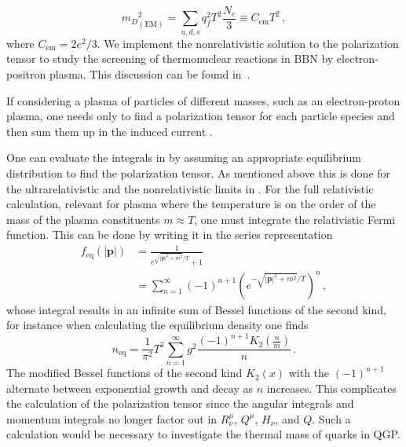 \begin{equation}\label{eq:Debyem}
    {m_D}^2_{(\text{EM})} = \sum_{u,d,s} q^2_f T^2 \frac{N_c}{3} \equiv C_{\text{em}}T^2\,,
\end{equation}
where $C_{\text{em}} =  2e^2/3$. We implement the nonrelativistic solution to the polarization tensor to study the screening of thermonuclear reactions in BBN by electron-positron plasma. This discussion can be found in~.

If considering a plasma of particles of different masses, such as an electron-proton plasma, one needs only to find a polarization tensor for each particle species and then sum them up in the induced current .

One can evaluate the integrals in  by assuming an appropriate equilibrium distribution to find the polarization tensor. As mentioned above this is done for the ultrarelativistic and the nonrelativistic limits in \cite{Formanek:2021blc}. For the full relativistic calculation, relevant for plasma where the temperature is on the order of the mass of the plasma constituents $m\approx T$, one must integrate the relativistic Fermi function. This can be done by writing it in the series representation \cite{Letessier:2002ony}
\begin{equation}
\begin{split}
     f_\mathrm{eq}(|\pmb{p}|) &= \frac{1}{e^{\sqrt{|\boldsymbol{p}|^2+ m^2}/T} + 1} \\
     &= \sum_{n=1}^{\infty} (-1)^{n+1}\left( e^{-\sqrt{|\boldsymbol{p}|^2+ m^2}/T}\right)^n\,,
    \end{split}
\end{equation}
whose integral results in an infinite sum of Bessel functions of the second kind, for instance when calculating the equilibrium density one finds
\begin{equation}
    n_\mathrm{eq}=\frac{1}{\pi^2}T^3\sum_{n=1}^{\infty}g^2\frac{ (-1)^{n+1} K_2\left(\frac{n}{m}\right)}{ n}\,.
\end{equation}
The modified Bessel functions of the second kind $K_2(x)$ with the $(-1)^{n+1}$ alternate between exponential growth and decay as $n$ increases. This complicates the calculation of the polarization tensor since the angular integrals and momentum integrals no longer factor out in $R^\mu_\nu$, $Q^\mu$, $H_\nu$, and $Q$. Such a calculation would be necessary to investigate the thermal mass of quarks in QGP.


